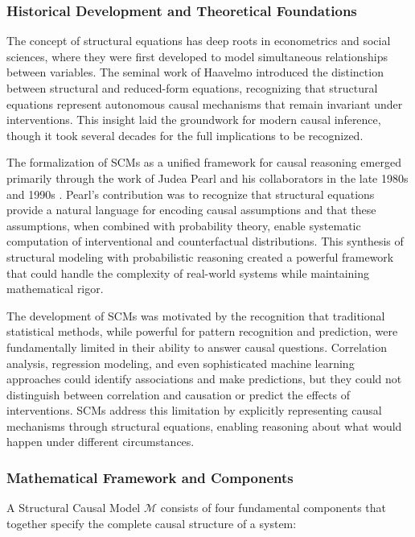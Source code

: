 \subsubsection{Historical Development and Theoretical Foundations}

The concept of structural equations has deep roots in econometrics and social sciences, where they were first developed to model simultaneous relationships between variables. The seminal work of Haavelmo \cite{Haavelmo1943} introduced the distinction between structural and reduced-form equations, recognizing that structural equations represent autonomous causal mechanisms that remain invariant under interventions. This insight laid the groundwork for modern causal inference, though it took several decades for the full implications to be recognized.

The formalization of SCMs as a unified framework for causal reasoning emerged primarily through the work of Judea Pearl and his collaborators in the late 1980s and 1990s \cite{Pearl2009}. Pearl's contribution was to recognize that structural equations provide a natural language for encoding causal assumptions and that these assumptions, when combined with probability theory, enable systematic computation of interventional and counterfactual distributions. This synthesis of structural modeling with probabilistic reasoning created a powerful framework that could handle the complexity of real-world systems while maintaining mathematical rigor.

The development of SCMs was motivated by the recognition that traditional statistical methods, while powerful for pattern recognition and prediction, were fundamentally limited in their ability to answer causal questions. Correlation analysis, regression modeling, and even sophisticated machine learning approaches could identify associations and make predictions, but they could not distinguish between correlation and causation or predict the effects of interventions. SCMs address this limitation by explicitly representing causal mechanisms through structural equations, enabling reasoning about what would happen under different circumstances.

\subsubsection{Mathematical Framework and Components}

A Structural Causal Model $\mathcal{M}$ consists of four fundamental components that together specify the complete causal structure of a system:

